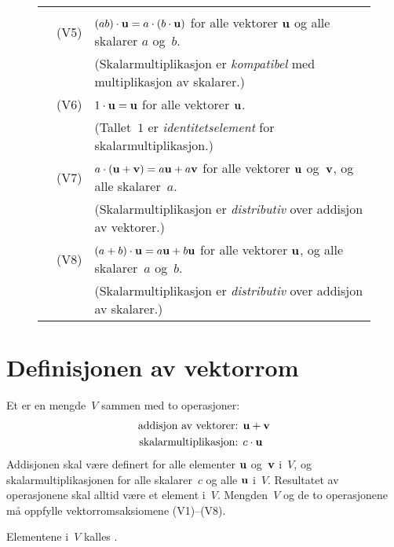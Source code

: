 \begin{figure*}[p]
\begin{center}
\begin{minipage}{.9\textwidth}
\begin{center}
\begin{tabular}{rll}
{}
\\[-4pt]
& {\large {\LARGE(}V5{\LARGE)}} &
$(ab) \cdot \mathbf{u} = a \cdot (b \cdot \mathbf{u})$
for alle vektorer $\mathbf{u}$ og alle skalarer $a$ og~$b$.
\\[4pt]
&&{\small (Skalarmultiplikasjon er \emph{kompatibel} med multiplikasjon av skalarer.)}
\\[10pt]
& {\large {\LARGE(}V6{\LARGE)}} &
$1 \cdot \mathbf{u} = \mathbf{u}$
for alle vektorer $\mathbf{u}$.
\\[4pt]
&&{\small (Tallet~$1$ er \emph{identitetselement} for skalarmultiplikasjon.)}
\\[10pt]
& {\large {\LARGE(}V7{\LARGE)}} &
$a \cdot (\mathbf{u} + \mathbf{v}) = a \mathbf{u} + a \mathbf{v}$
for alle vektorer $\mathbf{u}$ og~$\mathbf{v}$, og alle skalarer~$a$.
\\[4pt]
&&{\small (Skalarmultiplikasjon er \emph{distributiv} over addisjon av vektorer.)}
\\[10pt]
& {\large {\LARGE(}V8{\LARGE)}} &
$(a + b) \cdot \mathbf{u} = a \mathbf{u} + b \mathbf{u}$
for alle vektorer $\mathbf{u}$, og alle skalarer~$a$ og~$b$.
\\[4pt]
&&{\small (Skalarmultiplikasjon er \emph{distributiv} over addisjon av skalarer.)}
\end{tabular}
\hspace{10pt}\hbox{}

\vspace{30pt}
\end{center}
\end{minipage}
\end{center}
\label{fig:aksiomene}
\end{figure*}


\section*{Definisjonen av vektorrom}


\begin{defn} %
Et  er en mengde~$V$ sammen med to operasjoner:
\begin{align*}
\text{addisjon av vektorer: } & \mathbf{u} + \mathbf{v} \\
\text{skalarmultiplikasjon: } & c \cdot \mathbf{u}
\end{align*}
Addisjonen skal være definert for alle elementer $\mathbf{u}$ og~$\mathbf{v}$
i~$V$, og skalarmultiplikasjonen for alle skalarer~$c$ og alle $\mathbf{u}$
i~$V$.  Resultatet av operasjonene skal alltid være et element i~$V$.
Mengden~$V$ og de to operasjonene må oppfylle vektorromsaksiomene
(V1)--(V8).

Elementene i~$V$ kalles .
\end{defn}

